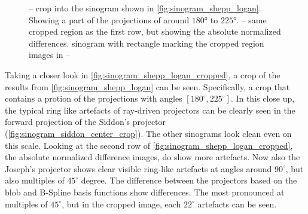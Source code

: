 \begin{figure}[h]
	\caption{--
		crop into the sinogram shown in \autoref{fig:sinogram_shepp_logan}. Showing a part
		of the projections of around \(180\)° to \(225\)°.
		--
		same cropped region as the first row, but showing the absolute normalized
		differences.  sinogram with rectangle marking the
		cropped region images in
		--
	}
	\label{fig:sinogram_shepp_logan_cropped}
\end{figure}

Taking a closer look in \autoref{fig:sinogram_shepp_logan_cropped}, a crop of the results from
\autoref{fig:sinogram_shepp_logan} can be seen. Specifically, a crop that contains a protion of the
projections with angles \([180^\circ, 225^\circ]\). In this close up, the typical ring like artefacts
of ray-driven projectors can be clearly seen in the forward projection of the Siddon's projector
(\autoref{fig:sinogram_siddon_center_crop}). The other sinograms look clean even on this scale.
Looking at the second row of \autoref{fig:sinogram_shepp_logan_cropped}, the absolute normalized
difference images, do show more artefacts. Now also the Joseph's projector shows clear visible
ring-like artefacts at angles around \(90^\circ\), but also multiples of \(45^\circ\) degree.
The difference between the projectors based on the blob and B-Spline basis functions show
differences. The most pronounced at multiples of \(45^\circ\), but in the cropped image, each
\(22^\circ\) artefacts can be seen.

